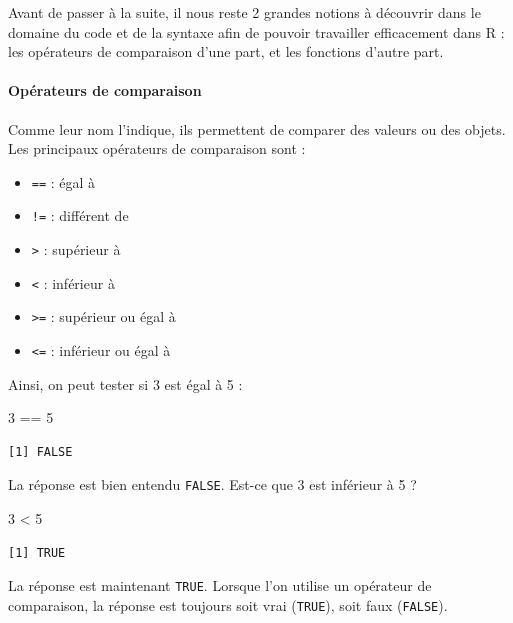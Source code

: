 \documentclass[a4paperpaper,]{article}
\newenvironment{Shaded}{\begin{snugshade}}{\end{snugshade}}
\newcommand{\DecValTok}[1]{\textcolor[rgb]{0.69,0.50,0.00}{#1}}
\newcommand{\OperatorTok}[1]{\textcolor[rgb]{0.12,0.11,0.11}{#1}}
\newcommand{\StringTok}[1]{\textcolor[rgb]{0.75,0.01,0.01}{#1}}
\providecommand{\tightlist}{%
  \setlength{\itemsep}{0pt}\setlength{\parskip}{0pt}}
\let\oldparagraph\paragraph
\renewcommand{\paragraph}[1]{\oldparagraph{#1}\mbox{}}
\begin{document}
Avant de passer à la suite, il nous reste 2 grandes notions à découvrir dans le domaine du code et de la syntaxe afin de pouvoir travailler efficacement dans R : les opérateurs de comparaison d'une part, et les fonctions d'autre part.

\hypertarget{comparaison}{%
\paragraph{Opérateurs de comparaison}\label{comparaison}}

Comme leur nom l'indique, ils permettent de comparer des valeurs ou des objets. Les principaux opérateurs de comparaison sont :

\begin{itemize}
\tightlist
\item
  \texttt{==} : égal à
\item
  \texttt{!=} : différent de
\item
  \texttt{\textgreater{}} : supérieur à
\item
  \texttt{\textless{}} : inférieur à
\item
  \texttt{\textgreater{}=} : supérieur ou égal à
\item
  \texttt{\textless{}=} : inférieur ou égal à
\end{itemize}

Ainsi, on peut tester si 3 est égal à 5 :

\begin{Shaded}
\begin{Highlighting}[]
\DecValTok{3} \OperatorTok{==}\StringTok{ }\DecValTok{5}
\end{Highlighting}
\end{Shaded}

\begin{verbatim}
[1] FALSE
\end{verbatim}

La réponse est bien entendu \texttt{FALSE}. Est-ce que 3 est inférieur à 5 ?

\begin{Shaded}
\begin{Highlighting}[]
\DecValTok{3} \OperatorTok{<}\StringTok{ }\DecValTok{5}
\end{Highlighting}
\end{Shaded}

\begin{verbatim}
[1] TRUE
\end{verbatim}

La réponse est maintenant \texttt{TRUE}. Lorsque l'on utilise un opérateur de comparaison, la réponse est toujours soit vrai (\texttt{TRUE}), soit faux (\texttt{FALSE}).
\end{document}
